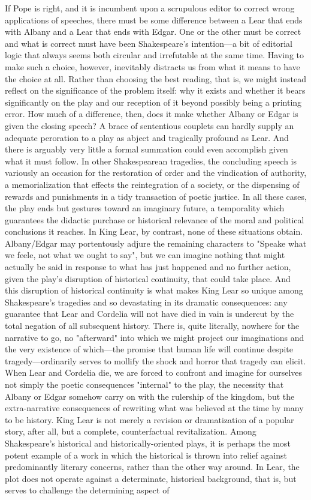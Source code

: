 If Pope is right, and it is incumbent upon a scrupulous editor to correct wrong applications of speeches, there must be some difference between a Lear that ends with Albany and a Lear that ends with Edgar. One or the other must be correct and what is correct must have been Shakespeare's intention—a bit of editorial logic that always seems both circular and irrefutable at the same time. Having to make such a choice, however, inevitably distracts us from what it means to have the choice at all. Rather than choosing the best reading, that is, we might instead reflect on the significance of the problem itself: why it exists and whether it bears significantly on the play and our reception of it beyond possibly being a printing error.	
	How much of a difference, then, does it make whether Albany or Edgar is given the closing speech? A brace of sententious couplets can hardly supply an adequate peroration to a play as abject and tragically profound as Lear. And there is arguably very little a formal summation could even accomplish given what it must follow. In other Shakespearean tragedies, the concluding speech is variously an occasion for the restoration of order and the vindication of authority, a memorialization that effects the reintegration of a society, or the dispensing of rewards and punishments in a tidy transaction of poetic justice. In all these cases, the play ends but gestures toward an imaginary future, a temporality which guarantees the didactic purchase or historical relevance of the moral and political conclusions it reaches. In King Lear, by contrast, none of these situations obtain. Albany/Edgar may portentously adjure the remaining characters to "Speake what we feele, not what we ought to say", but we can imagine nothing that might actually be said in response to what has just happened and no further action, given the play's disruption of historical continuity, that could take place. And this disruption of historical continuity is what makes King Lear so unique among Shakespeare's tragedies and so devastating in its dramatic consequences: any guarantee that Lear and Cordelia will not have died in vain is undercut by the total negation of all subsequent history. There is, quite literally, nowhere for the narrative to go, no "afterward" into which we might project our imaginations and the very existence of which—the promise that human life will continue despite tragedy—ordinarily serves to mollify the shock and horror that tragedy can elicit. When Lear and Cordelia die, we are forced to confront and imagine for ourselves not simply the poetic consequences "internal" to the play, the necessity that Albany or Edgar somehow carry on with the rulership of the kingdom, but the extra-narrative consequences of rewriting what was believed at the time by many to be history. King Lear is not merely a revision or dramatization of a popular story, after all, but a complete, counterfactual revitalization. Among Shakespeare's historical and historically-oriented plays, it is perhaps the most potent example of a work in which the historical is thrown into relief against predominantly literary concerns, rather than the other way around. In Lear, the plot does not operate against a determinate, historical background, that is, but serves to challenge the determining aspect of 